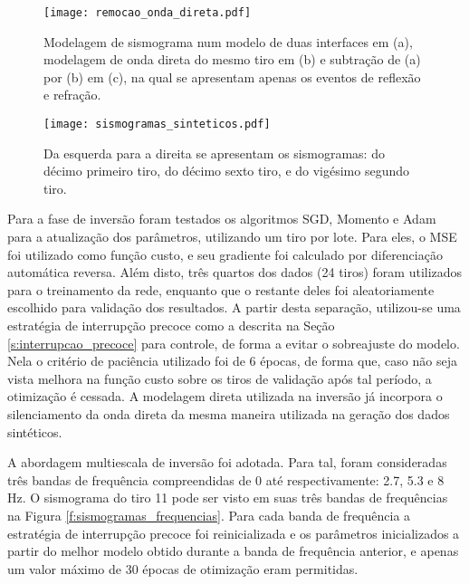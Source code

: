       \begin{figure}
        \begin{center}
          \texttt{[image: remocao\_onda\_direta.pdf]}
        \end{center}
        \caption{Modelagem de sismograma num modelo de duas interfaces em (a), modelagem de onda direta do mesmo tiro em (b) e subtração de (a) por (b) em (c), na qual se apresentam apenas os eventos de reflexão e refração.}
        \label{f:remocao_onda_direta}
      \end{figure}


      \begin{figure}
        \begin{center}
          \texttt{[image: sismogramas\_sinteticos.pdf]}
        \end{center}
        \caption{Da esquerda para a direita se apresentam os sismogramas: do décimo primeiro tiro, do décimo sexto tiro, e do vigésimo segundo tiro.}
        \label{f:sismogramas_sinteticos}
      \end{figure}

    Para a fase de inversão foram testados os algoritmos SGD, Momento e Adam para a atualização dos parâmetros, utilizando um tiro por lote. Para eles, o MSE foi utilizado como função custo, e seu gradiente foi calculado por diferenciação automática reversa. Além disto, três quartos dos dados (24 tiros) foram utilizados para o treinamento da rede, enquanto que o restante deles foi aleatoriamente escolhido para validação dos resultados. A partir desta separação, utilizou-se uma estratégia de interrupção precoce como a descrita na Seção \ref{s:interrupcao_precoce} para controle, de forma a evitar o sobreajuste do modelo. Nela o critério de paciência utilizado foi de 6 épocas, de forma que, caso não seja vista melhora na função custo sobre os tiros de validação após tal período, a otimização é cessada. A modelagem direta utilizada na inversão já incorpora o silenciamento da onda direta da mesma maneira utilizada na geração dos dados sintéticos.

    A abordagem multiescala de inversão foi adotada. Para tal, foram consideradas três bandas de frequência compreendidas de 0 até respectivamente: 2.7, 5.3 e 8 Hz. O sismograma do tiro 11 pode ser visto em suas três bandas de frequências na Figura \ref{f:sismogramas_frequencias}. Para cada banda de frequência a estratégia de interrupção precoce foi reinicializada e os parâmetros inicializados a partir do melhor modelo obtido durante a banda de frequência anterior, e apenas um valor máximo de 30 épocas de otimização eram permitidas.

